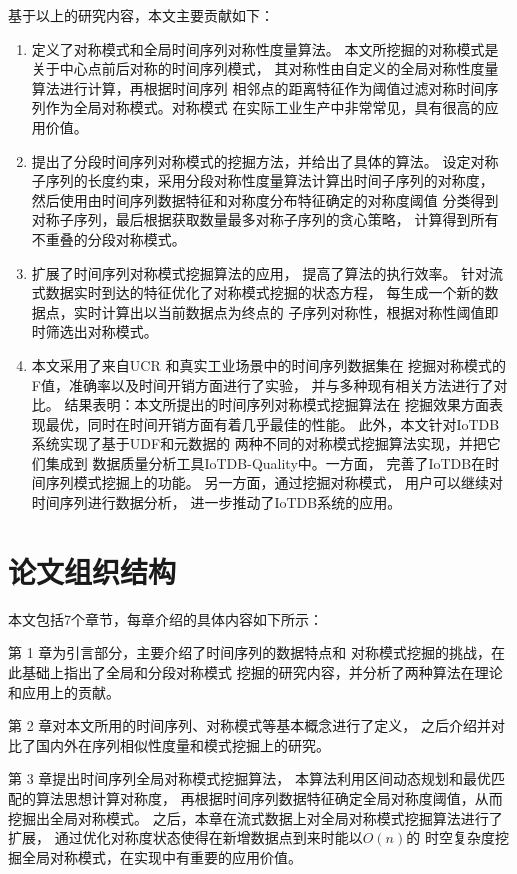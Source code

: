 基于以上的研究内容，本文主要贡献如下：
\begin{enumerate}
\item 定义了对称模式和全局时间序列对称性度量算法。
本文所挖掘的对称模式是关于中心点前后对称的时间序列模式，
其对称性由自定义的全局对称性度量算法进行计算，再根据时间序列
相邻点的距离特征作为阈值过滤对称时间序列作为全局对称模式。对称模式
在实际工业生产中非常常见，具有很高的应用价值。
\item 提出了分段时间序列对称模式的挖掘方法，并给出了具体的算法。
设定对称子序列的长度约束，采用分段对称性度量算法计算出时间子序列的对称度，
然后使用由时间序列数据特征和对称度分布特征确定的对称度阈值
分类得到对称子序列，最后根据获取数量最多对称子序列的贪心策略，
计算得到所有不重叠的分段对称模式。
\item 扩展了时间序列对称模式挖掘算法的应用，
提高了算法的执行效率。
针对流式数据实时到达的特征优化了对称模式挖掘的状态方程，
每生成一个新的数据点，实时计算出以当前数据点为终点的
子序列对称性，根据对称性阈值即时筛选出对称模式。
\item 本文采用了来自UCR\cite{DBLP:journals/ieeejas/DauBKYZGRK19}
和真实工业场景中的时间序列数据集在
挖掘对称模式的F值，准确率以及时间开销方面进行了实验，
并与多种现有相关方法进行了对比。
结果表明：本文所提出的时间序列对称模式挖掘算法在
挖掘效果方面表现最优，同时在时间开销方面有着几乎最佳的性能。
此外，本文针对IoTDB系统实现了基于UDF和元数据的
两种不同的对称模式挖掘算法实现，并把它们集成到
数据质量分析工具IoTDB-Quality中。一方面，
完善了IoTDB在时间序列模式挖掘上的功能。
另一方面，通过挖掘对称模式，
用户可以继续对时间序列进行数据分析，
进一步推动了IoTDB系统的应用。
\end{enumerate}

\section{论文组织结构}

本文包括7个章节，每章介绍的具体内容如下所示：

第 1 章为引言部分，主要介绍了时间序列的数据特点和
对称模式挖掘的挑战，在此基础上指出了全局和分段对称模式
挖掘的研究内容，并分析了两种算法在理论和应用上的贡献。

第 2 章对本文所用的时间序列、对称模式等基本概念进行了定义，
之后介绍并对比了国内外在序列相似性度量和模式挖掘上的研究。

第 3 章提出时间序列全局对称模式挖掘算法，
本算法利用区间动态规划和最优匹配的算法思想计算对称度，
再根据时间序列数据特征确定全局对称度阈值，从而挖掘出全局对称模式。
之后，本章在流式数据上对全局对称模式挖掘算法进行了扩展，
通过优化对称度状态使得在新增数据点到来时能以$O(n)$的
时空复杂度挖掘全局对称模式，在实现中有重要的应用价值。

